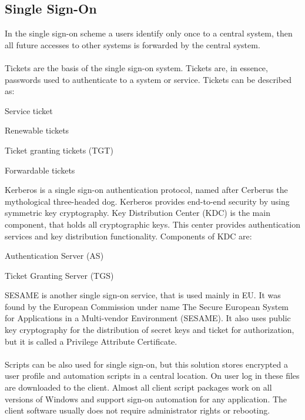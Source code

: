 \documentclass[twoside]{article}
\begin{document}
\begin{multicols}{2}
\section{Single Sign-On}
In the single sign-on scheme a users identify only once to a central system, then all future accesses to other systems is forwarded by the central system.\\\\
Tickets are the basis of the single sign-on system. Tickets are, in essence, passwords used to authenticate to a system or service. Tickets can be described as:
\begin{compactitem}
\item Service ticket
\item Renewable tickets
\item Ticket granting tickets (TGT)
\item Forwardable tickets
\end{compactitem}
Kerberos is a single sign-on authentication protocol, named after Cerberus the mythological three-headed dog. Kerberos provides end-to-end security by using symmetric key cryptography. Key Distribution Center (KDC) is the main component, that holds all cryptographic keys. This center provides authentication services and key distribution functionality. Components of KDC are:
\begin{compactitem}
\item Authentication Server (AS)
\item Ticket Granting Server (TGS)
\end{compactitem}
SESAME is another single sign-on service, that is used mainly in EU. It was found by the European Commission under name The Secure European System for Applications in a Multi-vendor Environment (SESAME). It also uses public key cryptography for the distribution of secret keys and ticket for authorization, but it is called a Privilege Attribute Certificate.\\\\
Scripts can be also used for single sign-on, but this solution stores encrypted a user profile and automation scripts in a central location. On user log in these files are downloaded to the client. Almost all client script packages work on all versions of Windows and support sign-on automation for any application. The client software usually does not require administrator rights or rebooting. 




\end{multicols}
\end{document}
